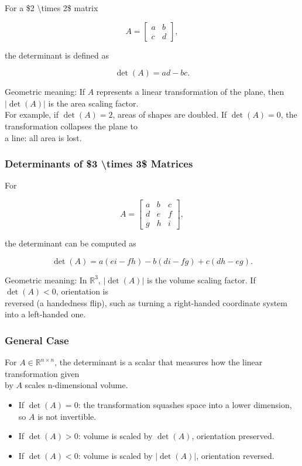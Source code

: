 \documentclass[
  12pt,
  a4paper,
]{article}
\begin{document}
For a \$2 \textbackslash times 2\$ matrix

\[A = \begin{bmatrix} a & b \\ c & d \end{bmatrix},\]

the determinant is defined as

\[\det(A) = ad - bc.\]

Geometric meaning: If \(A\) represents a linear transformation of the
plane, then \(|\det(A)|\) is the area scaling factor.\\
For example, if \(\det(A) = 2\), areas of shapes are doubled. If
\(\det(A) = 0\), the transformation collapses the plane to\\
a line: all area is lost.

\subsubsection{Determinants of \$3 \textbackslash times 3\$
Matrices}\label{determinants-of-ux243-times-3ux24-matrices}

For

\[A = \begin{bmatrix}
a & b & c \\
d & e & f \\
g & h & i
\end{bmatrix},\]

the determinant can be computed as

\[\det(A) = a(ei - fh) - b(di - fg) + c(dh - eg).\]

Geometric meaning: In \(\mathbb{R}^3\), \(|\det(A)|\) is the volume
scaling factor. If \(\det(A) < 0\), orientation is\\
reversed (a handedness flip), such as turning a right-handed coordinate
system into a left-handed one.

\subsubsection{General Case}\label{general-case}

For \(A \in \mathbb{R}^{n \times n}\), the determinant is a scalar that
measures how the linear transformation given\\
by \(A\) scales n-dimensional volume.

\begin{itemize}
\item
  If \(\det(A) = 0\): the transformation squashes space into a lower
  dimension, so \(A\) is not invertible.
\item
  If \(\det(A) > 0\): volume is scaled by \(\det(A)\), orientation
  preserved.
\item
  If \(\det(A) < 0\): volume is scaled by \(|\det(A)|\), orientation
  reversed.
\end{itemize}
\end{document}
